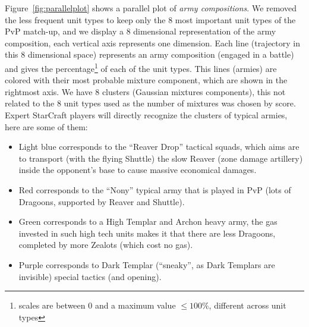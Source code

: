 Figure~\ref{fig:parallelplot} shows a parallel plot of \textit{army compositions}. We removed the less frequent unit types to keep only the 8 most important unit types of the PvP match-up, and we display a 8 dimensional representation of the army composition, each vertical axis represents one dimension. Each line (trajectory in this 8 dimensional space) represents an army composition (engaged in a battle) and gives the percentage\footnote{scales are between 0 and a maximum value $\leq 100\%$, different across unit types} of each of the unit types. This lines (armies) are colored with their most probable mixture component, which are shown in the rightmost axis. We have 8 clusters (Gaussian mixtures components), this not related to the 8 unit types used as the number of mixtures was chosen by  score. Expert StarCraft players will directly recognize the clusters of typical armies, here are some of them:
\begin{itemize}
    \item Light blue corresponds to the ``Reaver Drop'' tactical squads, which aims are to transport (with the flying Shuttle) the slow Reaver (zone damage artillery) inside the opponent's base to cause massive economical damages.
    \item Red corresponds to the ``Nony'' typical army that is played in PvP (lots of Dragoons, supported by Reaver and Shuttle).
    \item Green corresponds to a High Templar and Archon heavy army, the gas invested in such high tech units makes it that there are less Dragoons, completed by more Zealots (which cost no gas).
    \item Purple corresponds to Dark Templar (``sneaky'', as Dark Templars are invisible) special tactics (and opening).
\end{itemize}


